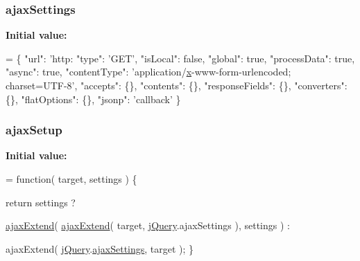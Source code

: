 \hypertarget{jquery-1_810_82-vsdoc_8js_adcbb4ce9148aaf3a9a165b2ac462163b}{
\subsubsection[{ajax\-Settings}]{ ajax\-Settings}}\label{jquery-1_810_82-vsdoc_8js_adcbb4ce9148aaf3a9a165b2ac462163b}
{\bfseries Initial value\-:}
\begin{DoxyCode}
= \{ \textcolor{stringliteral}{"url"}: \textcolor{stringliteral}{'http:}
\textcolor{stringliteral}{"type": '}GET\textcolor{stringliteral}{',}
\textcolor{stringliteral}{"isLocal": false,}
\textcolor{stringliteral}{"global": true,}
\textcolor{stringliteral}{"processData": true,}
\textcolor{stringliteral}{"async": true,}
\textcolor{stringliteral}{"contentType": '}application/\hyperlink{jquery-1_810_82_8min_8js_a5ce50d751c9664d05375c8f5080ed43e}{x}-www-form-urlencoded; charset=UTF-8\textcolor{stringliteral}{',}
\textcolor{stringliteral}{"accepts": \{\},}
\textcolor{stringliteral}{"contents": \{\},}
\textcolor{stringliteral}{"responseFields": \{\},}
\textcolor{stringliteral}{"converters": \{\},}
\textcolor{stringliteral}{"flatOptions": \{\},}
\textcolor{stringliteral}{"jsonp": '}callback\textcolor{stringliteral}{' \}}
\end{DoxyCode}
\hypertarget{jquery-1_810_82-vsdoc_8js_a3b12f4f2a83dfdae4e81bcaeaf2a2f42}{
\subsubsection[{ajax\-Setup}]{ ajax\-Setup}}\label{jquery-1_810_82-vsdoc_8js_a3b12f4f2a83dfdae4e81bcaeaf2a2f42}
{\bfseries Initial value\-:}
\begin{DoxyCode}
= \textcolor{keyword}{function}( target, settings ) \{


        \textcolor{keywordflow}{return} settings ?

            
            \hyperlink{jquery-1_810_82_8js_a113ade43cfd5328ebd5ccc84f45fe4de}{ajaxExtend}( \hyperlink{jquery-1_810_82_8js_a113ade43cfd5328ebd5ccc84f45fe4de}{ajaxExtend}( target, \hyperlink{jquery-1_810_82-vsdoc_8js_add5237586d970a38a81f990e8eb28c6c}{jQuery}.ajaxSettings ), settings ) :

            
            ajaxExtend( \hyperlink{jquery-1_810_82-vsdoc_8js_add5237586d970a38a81f990e8eb28c6c}{jQuery}.\hyperlink{jquery-1_810_82-vsdoc_8js_adcbb4ce9148aaf3a9a165b2ac462163b}{ajaxSettings}, target );
    \}
\end{DoxyCode}
